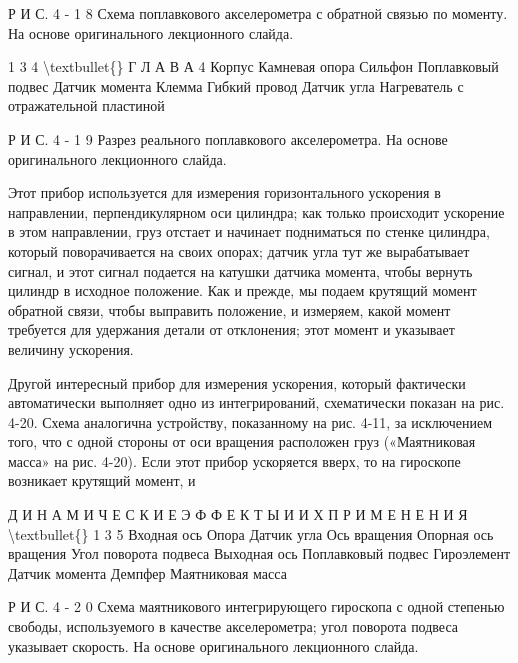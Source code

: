 \documentclass[10pt,oneside]{article}
\begin{document}
Р И С.  4 - 1 8 Схема поплавкового акселерометра с обратной связью по моменту. На основе оригинального лекционного слайда.\par

1 3 4 \textbackslash{}textbullet\{\} Г Л А В А  4 Корпус Камневая опора Сильфон Поплавковый подвес Датчик момента Клемма Гибкий провод Датчик угла Нагреватель с отражательной пластиной\par

Р И С.  4 - 1 9 Разрез реального поплавкового акселерометра. На основе оригинального лекционного слайда.\par

Этот прибор используется для измерения горизонтального ускорения в направлении, перпендикулярном оси цилиндра; как только происходит ускорение в этом направлении, груз отстает и начинает подниматься по стенке цилиндра, который поворачивается на своих опорах; датчик угла тут же вырабатывает сигнал, и этот сигнал подается на катушки датчика момента, чтобы вернуть цилиндр в исходное положение. Как и прежде, мы подаем крутящий момент обратной связи, чтобы выправить положение, и измеряем, какой момент требуется для удержания детали от отклонения; этот момент и указывает величину ускорения.\par

Другой интересный прибор для измерения ускорения, который фактически автоматически выполняет одно из интегрирований, схематически показан на рис. 4-20. Схема аналогична устройству, показанному на рис. 4-11, за исключением того, что с одной стороны от оси вращения расположен груз («Маятниковая масса» на рис. 4-20). Если этот прибор ускоряется вверх, то на гироскопе возникает крутящий момент, и\par

Д И Н А М И Ч Е С К И Е  Э Ф Ф Е К Т Ы  И  И Х  П Р И М Е Н Е Н И Я \textbackslash{}textbullet\{\} 1 3 5 Входная ось Опора Датчик угла Ось вращения Опорная ось вращения Угол поворота подвеса Выходная ось Поплавковый подвес Гироэлемент Датчик момента Демпфер Маятниковая масса\par

Р И С.  4 - 2 0 Схема маятникового интегрирующего гироскопа с одной степенью свободы, используемого в качестве акселерометра; угол поворота подвеса указывает скорость. На основе оригинального лекционного слайда.\par
\end{document}
